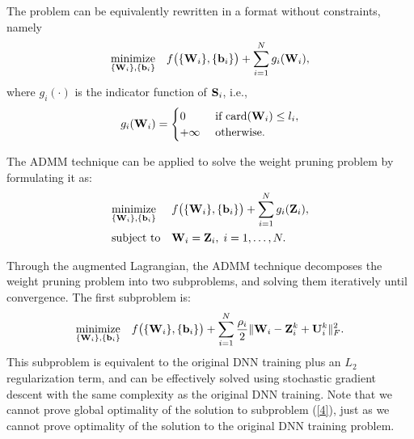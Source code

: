 \documentclass{article} %
\begin{document}
The problem can be equivalently rewritten in a format without constraints, namely
\begin{equation}
 \underset{ \{{\bf{W}}_{i}\},\{{\bf{b}}_{i} \}}{\text{minimize}}
\ \ \ f \big( \{{\bf{W}}_{i} \}, \{{\bf{b}}_{i} \} \big)+\sum_{i=1}^{N} g_{i}({\bf{W}}_{i}), 
\end{equation}
where $g_{i}(\cdot)$ is the indicator function of ${\bf{S}}_{i}$, i.e.,
\begin{eqnarray}g_{i}({\bf{W}}_{i})=
\begin{cases}
 0 & \text { if } \mathrm{card}({\bf{W}}_{i})\le l_{i}, \\ 
 +\infty & \text { otherwise. }
\end{cases}
\end{eqnarray}

The ADMM technique \citep{boyd2011} can be applied to solve the weight pruning problem by formulating it as:
\begin{equation*}
\begin{aligned}
& \underset{ \{{\bf{W}}_{i}\},\{{\bf{b}}_{i} \}}{\text{minimize}}
& & f \big( \{{\bf{W}}_{i} \}, \{{\bf{b}}_{i} \} \big)+\sum_{i=1}^{N} g_{i}({\bf{Z}}_{i}),
\\ & \text{subject to}
& & {\bf{W}}_{i}={\bf{Z}}_{i}, \; i = 1, \ldots, N.
\end{aligned}
\end{equation*}

Through the augmented Lagrangian, the ADMM technique decomposes the weight pruning problem into two subproblems, and solving them iteratively until convergence. The first subproblem is:
\begin{equation}
\label{4}
 \underset{ \{{\bf{W}}_{i}\},\{{\bf{b}}_{i} \}}{\text{minimize}}
\ \ \ f \big( \{{\bf{W}}_{i} \}, \{{\bf{b}}_{i} \} \big)+\sum_{i=1}^{N} \frac{\rho_{i}}{2}  \| {\bf{W}}_{i}-{\bf{Z}}_{i}^{k}+{\bf{U}}_{i}^{k} \|_{F}^{2}. \\
\end{equation}
This subproblem is equivalent to the original DNN training plus an $L_2$ regularization term, and can be effectively solved using stochastic gradient descent with the same complexity as the original DNN training.
Note that we cannot prove global optimality of the solution to subproblem (\ref{4}), just as we cannot prove optimality of the solution to the original DNN training problem.
\end{document}
